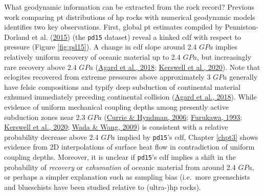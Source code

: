 What geodynamic information can be extracted from the rock record? Previous work comparing \gls{pt} distributions of \gls{hp} rocks with numerical geodynamic models identifies two key observations. First, global \gls{pt} estimates compiled by Penniston-Dorland et al. (\protect\hyperlink{ref-penniston2015}{2015}) (the \texttt{pd15} dataset) reveal a kinked \gls{cdf} with respect to pressure (Figure \ref{fig:pd15}). A change in \gls{cdf} slope around 2.4 \(GPa\) implies relatively uniform recovery of oceanic material up to 2.4 \(GPa\), but increasingly rare recovery above 2.4 \(GPa\) (\protect\hyperlink{ref-agard2018}{Agard et al., 2018}; \protect\hyperlink{ref-kerswell2020}{Kerswell et al., 2020}). Note that eclogites recovered from extreme pressures above approximately 3 \(GPa\) generally have felsic compositions and typify deep subduction of continental material exhumed immediately preceding continental collision (\protect\hyperlink{ref-agard2018}{Agard et al., 2018}). While evidence of uniform mechanical coupling depths among presently active subduction zones near 2.3 \(GPa\) (\protect\hyperlink{ref-currie2006}{Currie \& Hyndman, 2006}; \protect\hyperlink{ref-furukawa1993}{Furukawa, 1993}; \protect\hyperlink{ref-kerswell2020}{Kerswell et al., 2020}; \protect\hyperlink{ref-wada2009}{Wada \& Wang, 2009}) is consistent with a relative probability decrease above 2.4 \(GPa\) implied by \texttt{pd15}'s \gls{cdf}, Chapter \ref{chpt3} shows evidence from 2D interpolations of surface heat flow in contradiction of uniform coupling depths. Moreover, it is unclear if \texttt{pd15}'s \gls{cdf} implies a shift in the probability of \emph{recovery} or \emph{exhumation} of oceanic material from around 2.4 \(GPa\), or perhaps a simpler explanation such as sampling bias (i.e.~more greenschists and blueschists have been studied relative to (ultra-)\gls{hp} rocks).

